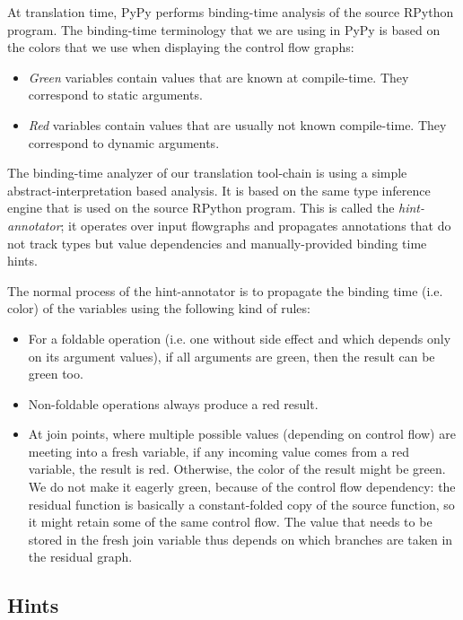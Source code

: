 At translation time, PyPy performs binding-time analysis of the source
RPython program.  The binding-time terminology that we are using in PyPy is based on the
colors that we use when displaying the control flow graphs:

\begin{itemize}
\item \emph{Green} variables contain values that are known at compile-time.
They correspond to static arguments.
\item \emph{Red} variables contain values that are usually not known
compile-time. They correspond to dynamic arguments.
\end{itemize}

The binding-time analyzer of our translation tool-chain is using a simple
abstract-interpretation based analysis. It is based on the
same type inference engine that is used on the source RPython program.
This is called the \emph{hint-annotator}; it
operates over input flowgraphs
and propagates annotations that do not track types but
value dependencies and manually-provided binding time hints.

The normal process of the hint-annotator is to propagate the binding
time (i.e. color) of the variables using the following kind of rules:

\begin{itemize}
\item For a foldable operation (i.e. one without side effect and which depends
only on its argument values), if all arguments are green, then the result can
be green too.

\item Non-foldable operations always produce a red result.

\item At join points, where multiple possible values (depending on control
flow) are meeting into a fresh variable, if any incoming value comes from a red
variable, the result is red.  Otherwise, the color of the result might be
green.  We do not make it eagerly green, because of the control flow
dependency: the residual function is basically a constant-folded copy of the
source function, so it might retain some of the same control flow.  The value
that needs to be stored in the fresh join variable thus depends on which
branches are taken in the residual graph.
\end{itemize}

\subsection{Hints}
\label{sec:hints}

